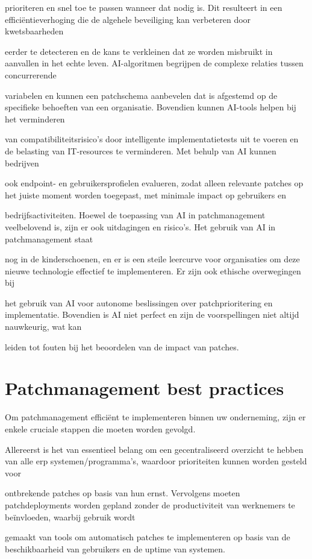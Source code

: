 prioriteren en snel toe te passen wanneer dat nodig is. Dit resulteert in een efficiëntieverhoging die de algehele beveiliging kan verbeteren door kwetsbaarheden 

eerder te detecteren en de kans te verkleinen dat ze worden misbruikt in aanvallen in het echte leven. AI-algoritmen begrijpen de complexe relaties tussen concurrerende

variabelen en kunnen een patchschema aanbevelen dat is afgestemd op de specifieke behoeften van een organisatie. Bovendien kunnen AI-tools helpen bij het verminderen 

van compatibiliteitsrisico's door intelligente implementatietests uit te voeren en de belasting van IT-resources te verminderen. Met behulp van AI kunnen bedrijven

ook endpoint- en gebruikersprofielen evalueren, zodat alleen relevante patches op het juiste moment worden toegepast, met minimale impact op gebruikers en 

bedrijfsactiviteiten. Hoewel de toepassing van AI in patchmanagement veelbelovend is, zijn er ook uitdagingen en risico's. Het gebruik van AI in patchmanagement staat

nog in de kinderschoenen, en er is een steile leercurve voor organisaties om deze nieuwe technologie effectief te implementeren. Er zijn ook ethische overwegingen bij

het gebruik van AI voor autonome beslissingen over patchprioritering en implementatie. Bovendien is AI niet perfect en zijn de voorspellingen niet altijd nauwkeurig, wat kan 

leiden tot fouten bij het beoordelen van de impact van patches. \autocite{OFlaherty2023}

\section{Patchmanagement best practices}
Om patchmanagement efficiënt te implementeren binnen uw onderneming, zijn er enkele cruciale stappen die moeten worden gevolgd. 

Allereerst is het van essentieel belang om een gecentraliseerd overzicht te hebben van alle erp systemen/programma's, waardoor prioriteiten kunnen worden gesteld voor 

ontbrekende patches op basis van hun ernst. Vervolgens moeten patchdeployments worden gepland zonder de productiviteit van werknemers te beïnvloeden, waarbij gebruik wordt 

gemaakt van tools om automatisch patches te implementeren op basis van de beschikbaarheid van gebruikers en de uptime van systemen.

